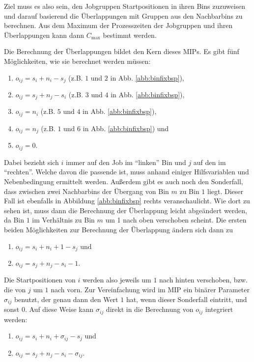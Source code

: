 \documentclass{scrreprt}
\begin{document}
Ziel muss es also sein, den Jobgruppen Startpositionen in ihren Bins zuzuweisen und darauf basierend die Überlappungen mit Gruppen 
aus den Nachbarbins zu berechnen. 
Aus dem Maximum der Prozesszeiten der Jobgruppen und ihren Überlappungen kann dann $C_{\max}$ bestimmt werden.

Die Berechnung der Überlappungen bildet den Kern dieses MIPs.
Es gibt fünf Möglichkeiten, wie sie berechnet werden müssen:
\begin{enumerate}
    \item $o_{ij} = s_i + n_i - s_j$ (z.B. $1$ und $2$ in Abb. \ref{abb:binfixbsp}),
    \item $o_{ij} = s_j + n_j - s_i$ (z.B. $3$ und $4$ in Abb. \ref{abb:binfixbsp}),
    \item $o_{ij} = n_i$ (z.B. $5$ und $4$ in Abb. \ref{abb:binfixbsp}),
    \item $o_{ij} = n_j$ (z.B. $1$ und $6$ in Abb. \ref{abb:binfixbsp}) und
    \item $o_{ij} = 0$.
\end{enumerate}
Dabei bezieht sich $i$ immer auf den Job im "`linken"' Bin und $j$ auf den im "`rechten"'.
Welche davon die passende ist, muss anhand einiger Hilfsvariablen und Nebenbedingung ermittelt werden.
Außerdem gibt es auch noch den Sonderfall, dass zwischen zwei Nachbarbins der Übergang von Bin $m$ zu Bin $1$ liegt.
Dieser Fall ist ebenfalls in Abbildung \ref{abb:binfixbsp} rechts veranschaulicht.
Wie dort zu sehen ist, muss dann die Berechnung der Überlappung leicht abgeändert werden, da Bin $1$ im Verhältnis zu Bin $m$ um 1 nach oben verschoben scheint.
Die ersten beiden Möglichkeiten zur Berechnung der Überlappung ändern sich dann zu
\begin{enumerate}
    \item $o_{ij} = s_i + n_i + 1 - s_j$ und 
    \item $o_{ij} = s_j + n_j - s_i - 1$.
\end{enumerate}
Die Startpositionen von $i$ werden also jeweils um $1$ nach hinten verschoben, bzw. die von $j$ um $1$ nach vorn.
Zur Vereinfachung wird im MIP ein binärer Parameter $\sigma_{ij}$ benutzt, der genau dann den Wert $1$ hat, wenn dieser Sonderfall eintritt, und sonst $0$.
Auf diese Weise kann $\sigma_{ij}$ direkt in die Berechnung von $o_{ij}$ integriert werden:
\begin{enumerate}
    \item $o_{ij} = s_i + n_i + \sigma_{ij} - s_j$ und 
    \item $o_{ij} = s_j + n_j - s_i - \sigma_{ij}$.
\end{enumerate}
\end{document}
